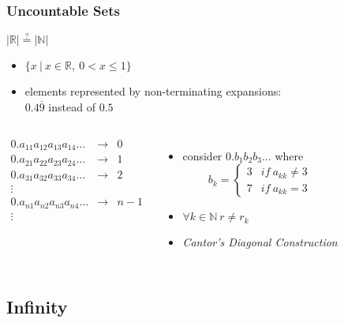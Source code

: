 \documentclass[dvipsnames]{beamer}
\begin{document}
\begin{frame}
  \frametitle{Uncountable Sets}

  $|\mathbb{R}| \stackrel{?}{=} |\mathbb{N}|$

  \begin{itemize}
    \item $\{x~|~x \in \mathbb{R},~0 < x \leq 1\}$
    \item elements represented by non-terminating expansions:\\
      $0.4\overline{9}$ instead of $0.5$
  \end{itemize}

  \pause
  \begin{columns}[t]
    \[
    \begin{array}{lcl}
      0.a_{11}a_{12}a_{13}a_{14}\ldots & \rightarrow & 0\\
      0.a_{21}a_{22}a_{23}a_{24}\ldots & \rightarrow & 1\\
      0.a_{31}a_{32}a_{33}a_{34}\ldots & \rightarrow & 2\\
      \vdots                           &             &\\
      0.a_{n1}a_{n2}a_{n3}a_{n4}\ldots & \rightarrow & n-1\\
      \vdots                           &             &
    \end{array}
    \]

    \pause
    \begin{itemize}
      \item consider $0.b_1b_2b_3\ldots$ where
      \begin{equation*}
        b_k = \left\{
          \begin{array}{ll}
            3 & if~a_{kk} \neq 3\\
            7 & if~a_{kk} = 3
          \end{array}\right.
      \end{equation*}

      \pause
      \item $\forall k \in \mathbb{N}~r \neq r_k$
      \item \emph{Cantor's Diagonal Construction}
    \end{itemize}
  \end{columns}
\end{frame}

\subsection{Infinity}
\end{document}
